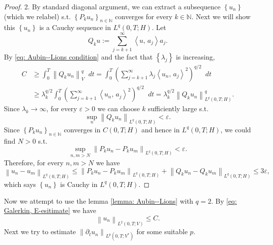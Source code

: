 \documentclass[a4paper, 12pt, oneside]{amsart}
\theoremstyle{definition}
\theoremstyle{remark}
\newcommand{\norm}[1]{\left\lVert #1 \right\rVert}
\newcommand{\bk}[2]{\left\langle #1,\, #2 \right\rangle}
\newcommand{\set}[1]{\left\{ #1 \right\}}
\newcommand{\dt}{\mathop{}\!dt}
\renewcommand{\leq}{\leqslant}
\renewcommand{\geq}{\geqslant}
\newcommand{\p}{\partial}
\newcommand{\N}{\mathbb{N}}
\newcommand{\e}{\varepsilon}
\begin{document}
\begin{proof}
    2. By standard diagonal argument, we can extract a subsequence $\set{u_n}$ (which we relabel) s.t. $\set{P_ku_n}_{n\in\N}$ converges for every $k\in\N$. Next we will show this $\set{u_n}$ is a Cauchy sequence in $L^q(0, T; H)$. Let
    \begin{equation}
        Q_ku := \sum_{j=k+1}^\infty\bk{u}{a_j}a_j.
    \end{equation}
    By \eqref{eq: Aubin--Lions condition} and the fact that $\set{\lambda_j}$ is increasing,
    \begin{align*}
        C&\geq\int_0^T\norm{Q_ku_n}_V^q\dt
        =\int_0^T\left(\sum_{j=k+1}^\infty\lambda_j\bk{u_n}{a_j}^2\right)^{q/2}\dt\\
        &\geq\lambda_k^{q/2}\int_0^T\left(\sum_{j=k+1}^\infty\bk{u_n}{a_j}^2\right)^{q/2}\dt
        =\lambda_k^{q/2}\norm{Q_ku_n}_{L^q(0, T; H)}^q.
    \end{align*}
    Since $\lambda_k\to\infty$, for every $\e>0$ we can choose $k$ sufficiently large s.t.
    \[
        \sup_n\norm{Q_ku_n}_{L^q(0, T; H)}<\e.
    \]
    Since $\set{P_ku_n}_{n\in\N}$ converges in $C(0, T; H)$ and hence in $L^q(0, T; H)$, we could find $N>0$ s.t.
    \[
        \sup_{n, m>N}\norm{P_ku_n-P_ku_m}_{L^q(0, T; H)}<\e.
    \]
    Therefore, for every $n, m>N$ we have
    \[
        \norm{u_n-u_m}_{L^q(0, T; H)}\leq\norm{P_ku_n-P_ku_m}_{L^q(0, T; H)} + \norm{Q_ku_n-Q_ku_m}_{L^q(0, T; H)}\leq 3\e,
    \]
    which says $\set{u_n}$ is Cauchy in ${L^q(0, T; H)}$.
\end{proof}

Now we attempt to use the lemma \ref{lemma: Aubin--Lions} with $q=2$. By \eqref{eq: Galerkin, E-esitimate} we have
\[
    \norm{u_n}_{L^2(0, T; V)}\leq C.
\]
Next we try to estimate $\norm{\p_t u_n}_{L^{p}(0, T; V^*)}$ for some suitable $p$. 
\end{document}
